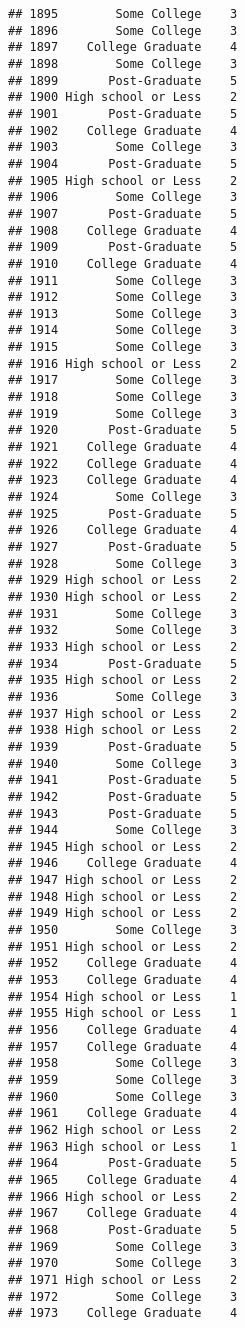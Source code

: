 \documentclass[
]{article}
\begin{document}
\begin{verbatim}
## 1895        Some College    3
## 1896        Some College    3
## 1897    College Graduate    4
## 1898        Some College    3
## 1899       Post-Graduate    5
## 1900 High school or Less    2
## 1901       Post-Graduate    5
## 1902    College Graduate    4
## 1903        Some College    3
## 1904       Post-Graduate    5
## 1905 High school or Less    2
## 1906        Some College    3
## 1907       Post-Graduate    5
## 1908    College Graduate    4
## 1909       Post-Graduate    5
## 1910    College Graduate    4
## 1911        Some College    3
## 1912        Some College    3
## 1913        Some College    3
## 1914        Some College    3
## 1915        Some College    3
## 1916 High school or Less    2
## 1917        Some College    3
## 1918        Some College    3
## 1919        Some College    3
## 1920       Post-Graduate    5
## 1921    College Graduate    4
## 1922    College Graduate    4
## 1923    College Graduate    4
## 1924        Some College    3
## 1925       Post-Graduate    5
## 1926    College Graduate    4
## 1927       Post-Graduate    5
## 1928        Some College    3
## 1929 High school or Less    2
## 1930 High school or Less    2
## 1931        Some College    3
## 1932        Some College    3
## 1933 High school or Less    2
## 1934       Post-Graduate    5
## 1935 High school or Less    2
## 1936        Some College    3
## 1937 High school or Less    2
## 1938 High school or Less    2
## 1939       Post-Graduate    5
## 1940        Some College    3
## 1941       Post-Graduate    5
## 1942       Post-Graduate    5
## 1943       Post-Graduate    5
## 1944        Some College    3
## 1945 High school or Less    2
## 1946    College Graduate    4
## 1947 High school or Less    2
## 1948 High school or Less    2
## 1949 High school or Less    2
## 1950        Some College    3
## 1951 High school or Less    2
## 1952    College Graduate    4
## 1953    College Graduate    4
## 1954 High school or Less    1
## 1955 High school or Less    1
## 1956    College Graduate    4
## 1957    College Graduate    4
## 1958        Some College    3
## 1959        Some College    3
## 1960        Some College    3
## 1961    College Graduate    4
## 1962 High school or Less    2
## 1963 High school or Less    1
## 1964       Post-Graduate    5
## 1965    College Graduate    4
## 1966 High school or Less    2
## 1967    College Graduate    4
## 1968       Post-Graduate    5
## 1969        Some College    3
## 1970        Some College    3
## 1971 High school or Less    2
## 1972        Some College    3
## 1973    College Graduate    4

\end{verbatim}
\end{document}
